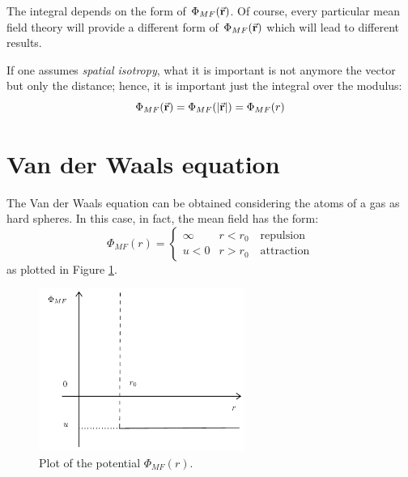 \documentclass[../main/main.tex]{subfiles}
\begin{document}
\begin{remark}
The integral depends on the form of \( \Phi _{MF} (\va{r})  \). Of course, every particular mean field theory will provide a different form of \( \Phi _{MF} (\va{r})  \) which will lead to different results.
\end{remark}

If one assumes \emph{spatial isotropy},
what it is important is not anymore the vector but only the distance; hence, it is important just the integral over the modulus:
\begin{equation*}
    \Phi _{MF} (\va{r}) = \Phi _{MF} (\abs{\va{r}} ) = \Phi _{MF} (r)
\end{equation*}

\section{Van der Waals equation}
The Van der Waals equation can be obtained considering the atoms of a gas as hard spheres. In this case, in fact, the mean field has the form:
\begin{equation}
\Phi _{MF} (r) =
  \begin{cases}
   \infty & r < r_0 \quad  \text{repulsion}\\
   u < 0 & r> r_0  \quad \text{attraction}
  \end{cases}
\end{equation}
as plotted in Figure \ref{fig:14_1}.
\begin{figure}[h!]
\centering
\includegraphics[width=0.6\textwidth]{../lessons/14_image/1.pdf}
\caption{\label{fig:14_1} Plot of the potential \( \Phi _{MF} (r) \).}
\end{figure}
\end{document}
